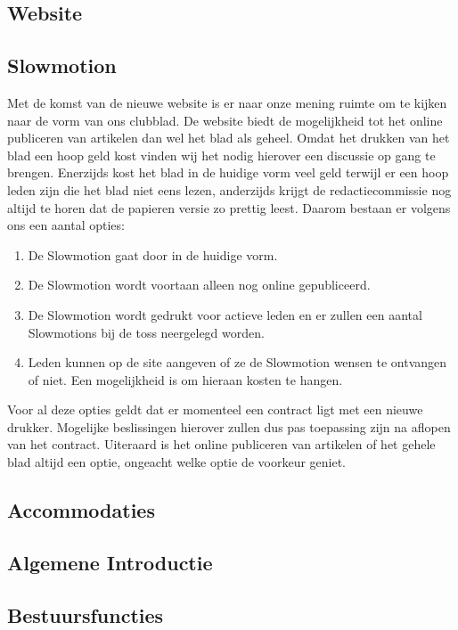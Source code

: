 \documentclass[]{article}
\begin{document}
\subsection{Website}

\subsection{Slowmotion}
Met de komst van de nieuwe website is er naar onze mening ruimte om te kijken naar de vorm van ons clubblad. De website biedt de mogelijkheid tot het online publiceren van artikelen dan wel het blad als geheel. Omdat het drukken van het blad een hoop geld kost vinden wij het nodig hierover een discussie op gang te brengen. Enerzijds kost het blad in de huidige vorm veel geld terwijl er een hoop leden zijn die het blad niet eens lezen, anderzijds krijgt de redactiecommissie nog altijd te horen dat de papieren versie zo prettig leest. Daarom bestaan er volgens ons een aantal opties:
\begin{enumerate}
	\item
	De Slowmotion gaat door in de huidige vorm.
	\item
	De Slowmotion wordt voortaan alleen nog online gepubliceerd.
	\item
	De Slowmotion wordt gedrukt voor actieve leden en er zullen een aantal Slowmotions bij de toss neergelegd worden.
	\item
	Leden kunnen op de site aangeven of ze de Slowmotion wensen te ontvangen of niet. Een mogelijkheid is om hieraan kosten te hangen.
\end{enumerate}
Voor al deze opties geldt dat er momenteel een contract ligt met een nieuwe drukker. Mogelijke beslissingen hierover zullen dus pas toepassing zijn na aflopen van het contract. Uiteraard is het online publiceren van artikelen of het gehele blad altijd een optie, ongeacht welke optie de voorkeur geniet.
\subsection{Accommodaties}

\subsection{Algemene Introductie}

\subsection{Bestuursfuncties}
\end{document}
